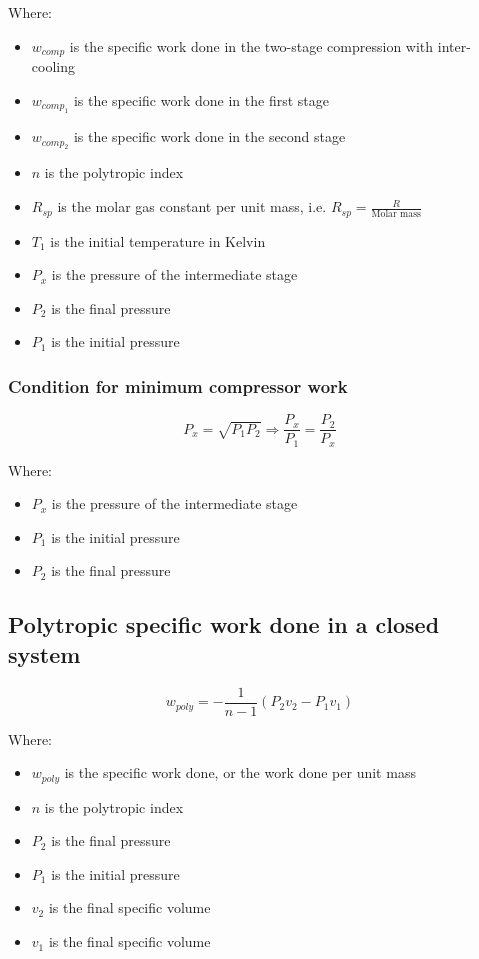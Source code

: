 \documentclass[11pt]{article}
\begin{document}
Where:
\begin{itemize}
\item \(w_{comp}\) is the specific work done in the two-stage compression with inter-cooling
\item \(w_{comp_1}\) is the specific work done in the first stage
\item \(w_{comp_2}\) is the specific work done in the second stage
\item \(n\) is the polytropic index
\item \(R_{sp}\) is the molar gas constant per unit mass, i.e. \(R_{sp} = \frac{R}{\text{Molar mass}}\)
\item \(T_1\) is the initial temperature in Kelvin
\item \(P_x\) is the pressure of the intermediate stage
\item \(P_2\) is the final pressure
\item \(P_1\) is the initial pressure
\end{itemize}
\subsubsection{Condition for minimum compressor work}
\label{sec:orgdcbf92f}
\[P_x = \sqrt{P_1 P_2} \Rightarrow \frac{P_x}{P_1} = \frac{P_2}{P_x}\]

Where:
\begin{itemize}
\item \(P_x\) is the pressure of the intermediate stage
\item \(P_1\) is the initial pressure
\item \(P_2\) is the final pressure
\end{itemize}

 \newpage
\subsection{Polytropic specific work done in a closed system}
\label{sec:org1847095}
\[w_{poly} = - \frac{1}{n - 1} (P_2 v_2 - P_1 v_1)\]

Where:
\begin{itemize}
\item \(w_{poly}\) is the specific work done, or the work done per unit mass
\item \(n\) is the polytropic index
\item \(P_2\) is the final pressure
\item \(P_1\) is the initial pressure
\item \(v_2\) is the final specific volume
\item \(v_1\) is the final specific volume
\end{itemize}
\end{document}
